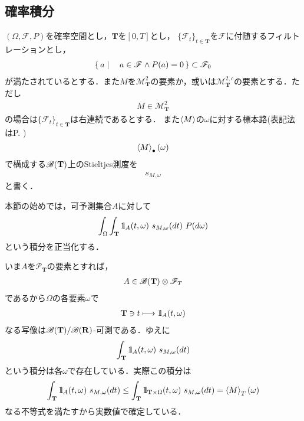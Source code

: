 \subsection{確率積分}
	$(\Omega,\mathscr{F},P)$を確率空間とし，$\mathbf{T}$を$[0,T]$とし，
	$\{\mathscr{F}_t\}_{t \in \mathbf{T}}$を$\mathscr{F}$に付随するフィルトレーションとし，
	\begin{align}
		\left\{\, a \mid \quad a \in \mathscr{F} \wedge P(a) = 0\, \right\} \subset \mathscr{F}_0
	\end{align}
	が満たされているとする．また$M$を$\mathscr{M}^2_{\mathbf{T}}$の要素か，或いは$\mathscr{M}^{2,c}_{\mathbf{T}}$の要素とする．ただし
	\begin{align}
		M \in \mathscr{M}^2_{\mathbf{T}}
	\end{align}
	の場合は$\{\mathscr{F}_t\}_{t \in \mathbf{T}}$は右連続であるとする．
	また$\inprod<M>$の$\omega$に対する標本路(表記法はP. \pageref{def:omega_to_path_mapping})
	\begin{align}
		\inprod<M>_\bullet(\omega)
	\end{align}
	で構成する$\mathscr{B}(\mathbf{T})$上のStieltjes測度を
	\begin{align}
		s_{M,\omega}
	\end{align}
	と書く．
	
	本節の始めでは，可予測集合$A$に対して
	\begin{align}
		\int_\Omega \int_{\mathbf{T}} \defunc_A(t,\omega)\ s_{M,\omega}(dt)\ P(d\omega)
	\end{align}
	という積分を正当化する．
	
	いま$A$を$\mathscr{P}_{\mathbf{T}}$の要素とすれば，
	\begin{align}
		A \in \mathscr{B}(\mathbf{T}) \otimes \mathscr{F}_T
	\end{align}
	であるから$\Omega$の各要素$\omega$で
	\begin{align}
		\mathbf{T} \ni t \longmapsto \mbox{1}\hspace{-0.25em}\mbox{l}_A(t,\omega)
	\end{align}
	なる写像は$\mathscr{B}(\mathbf{T})/\mathscr{B}(\mathbf{R})$-可測である．ゆえに
	\begin{align}
		\int_{\mathbf{T}} \mbox{1}\hspace{-0.25em}\mbox{l}_A(t,\omega)\ s_{M,\omega}(dt)
	\end{align}
	という積分は各$\omega$で存在している．実際この積分は
	\begin{align}
		\int_{\mathbf{T}} \defunc_A(t,\omega)\ s_{M,\omega}(dt)
		\leq \int_{\mathbf{T}} \defunc_{\mathbf{T} \times \Omega}(t,\omega)\ s_{M,\omega}(dt)
		= \inprod<M>_T(\omega)
	\end{align}
	なる不等式を満たすから実数値で確定している．
	
